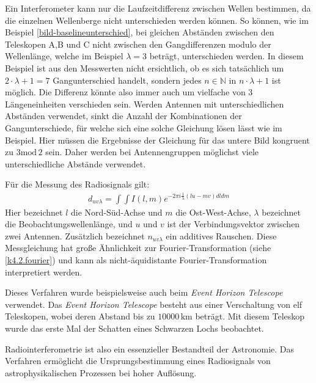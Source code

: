 Ein Interferometer kann nur die Laufzeitdifferenz zwischen Wellen bestimmen, da die einzelnen Wellenberge nicht unterschieden werden können. So können, wie im Beispiel  \cref{bild-baselineunterschied}, bei gleichen Abständen zwischen den Teleskopen A,B und C nicht zwischen den Gangdifferenzen modulo der Wellenlänge, welche im Beispiel $\lambda = 3$ beträgt, unterschieden werden. In diesem Beispiel ist aus den Messwerten nicht ersichtlich, ob es sich tatsächlich um $2\cdot \lambda +1 = 7$ Gangunterschied handelt, sondern jedes $n\in \mathbb{N}$ in $n\cdot\lambda+1$ ist möglich. Die Differenz könnte also immer auch um vielfache von 3 Längeneinheiten verschieden sein. Werden Antennen mit unterschiedlichen Abständen verwendet, sinkt die Anzahl der Kombinationen der Gangunterschiede, für welche sich eine solche Gleichung lösen lässt wie im Beispiel. Hier müssen die Ergebnisse der Gleichung für das untere Bild kongruent zu $3\mathrm{mod}\,2$ sein. Daher werden bei Antennengruppen möglichst viele unterschiedliche Abstände verwendet.

Für die Messung des Radiosignals gilt:
\begin{eqnarray}
d_{uv\lambda} =\int\int I(l,m)e^{-2\pi i \frac{1}{\lambda}(lu-mv)dldm}
\end{eqnarray}
Hier bezeichnet $l$ die Nord-Süd-Achse und $m$ die Ost-West-Achse, $\lambda$ bezeichnet die Beobachtungswellenlänge, und $u$ und $v$ ist der Verbindungsvektor zwischen zwei Antennen. Zusätzlich bezeichnet $n_{uv\lambda}$ ein additives Rauschen. Diese Messgleichung hat große Ähnlichkeit zur Fourier-Transformation (siehe \cref{k4.2.fourier}) und kann als nicht-äquidistante Fourier-Transformation interpretiert werden.

Dieses Verfahren wurde beispielsweise auch beim \emph{Event Horizon Telescope} verwendet. Das \emph{Event Horizon Telescope} besteht aus einer Verschaltung von elf Teleskopen, wobei deren Abstand bis zu $10000\,\text{km}$ beträgt. Mit diesem Teleskop wurde das erste Mal der Schatten eines Schwarzen Lochs beobachtet.

Radiointerferometrie ist also ein essenzieller Bestandteil der Astronomie. Das Verfahren er\-möglicht die Ursprungsbestimmung eines Radiosignals von astrophysikalischen Prozessen bei hoher Auflösung.
